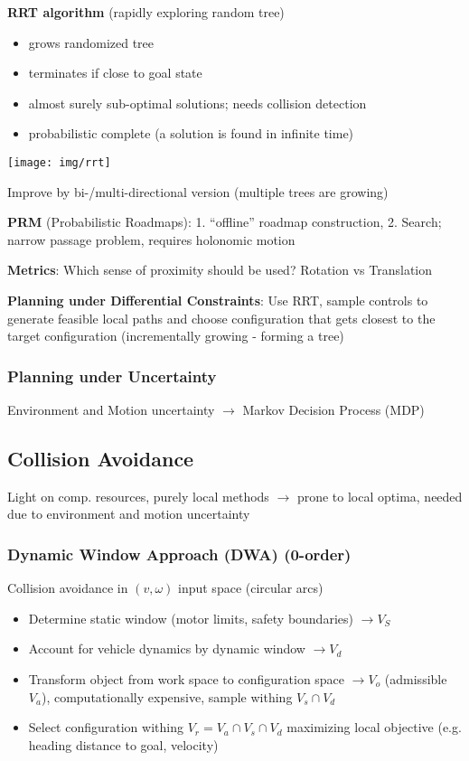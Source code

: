 \documentclass[fontsize=6pt]{scrartcl}
\begin{document}
\begin{multicols*}{4}
\begin{minipage}{0.55\linewidth}
	\textbf{RRT algorithm} (rapidly exploring random tree)
	\begin{itemize}
		\item grows randomized tree
		\item terminates if close to goal state
		\item almost surely sub-optimal solutions; needs collision detection
		\item probabilistic complete (a solution is found in infinite time)
	\end{itemize}
\end{minipage}
\begin{minipage}{0.45\linewidth}
	\texttt{[image: img/rrt]}
\end{minipage}

Improve by bi-/multi-directional version (multiple trees are growing)

\textbf{PRM} (Probabilistic Roadmaps): 1. \enquote{offline} roadmap construction, 2. Search; narrow passage problem, requires holonomic motion

\textbf{Metrics}: Which sense of proximity should be used? Rotation vs Translation

\textbf{Planning under Differential Constraints}: Use RRT, sample controls to generate feasible local paths and choose configuration that gets closest to the target configuration (incrementally growing - forming a tree)


\subsubsection*{Planning under Uncertainty}
Environment  and Motion uncertainty $\rightarrow$ Markov Decision Process (MDP)


\subsection*{Collision Avoidance}
Light on comp. resources, purely local methods $\rightarrow$ prone to local optima, needed due to environment and motion uncertainty

\subsubsection*{Dynamic Window Approach (DWA) (0-order)}
Collision avoidance in $(v,\omega)$ input space (circular arcs)
\begin{itemize}
	\item Determine static window (motor limits, safety boundaries) $\rightarrow V_S$
	\item Account for vehicle dynamics by dynamic window $\rightarrow V_d$
	\item Transform object from work space to configuration space $\rightarrow V_o$ (admissible $V_a$), computationally expensive, sample withing $V_s \cap V_d$
	\item Select configuration withing $V_r = V_a \cap V_s \cap V_d$ maximizing local objective (e.g. heading distance to goal, velocity)
\end{itemize}


\end{multicols*}
\end{document}
